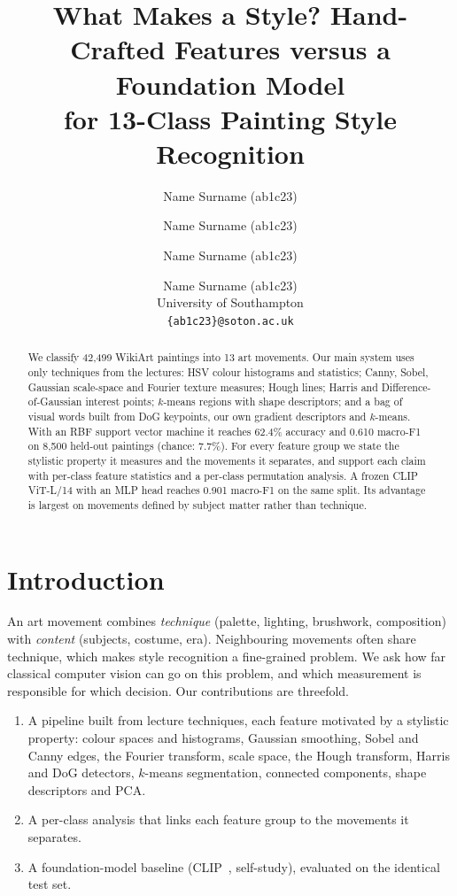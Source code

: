 \documentclass[10pt,twocolumn,a4paper]{article}
\begin{document}
\title{What Makes a Style? Hand-Crafted Features versus a Foundation Model\\for 13-Class Painting Style Recognition}

\author{
Name Surname (ab1c23) \and Name Surname (ab1c23) \and Name Surname (ab1c23) \and Name Surname (ab1c23)\\
University of Southampton\\
{\tt\small \{ab1c23\}@soton.ac.uk}
}

\maketitle

\begin{abstract}
We classify 42{,}499 WikiArt paintings into 13 art movements. Our main system uses only techniques from the lectures: HSV colour histograms and statistics; Canny, Sobel, Gaussian scale-space and Fourier texture measures; Hough lines; Harris and Difference-of-Gaussian interest points; $k$-means regions with shape descriptors; and a bag of visual words built from DoG keypoints, our own gradient descriptors and $k$-means. With an RBF support vector machine it reaches 62.4\% accuracy and 0.610 macro-F1 on 8{,}500 held-out paintings (chance: 7.7\%). For every feature group we state the stylistic property it measures and the movements it separates, and support each claim with per-class feature statistics and a per-class permutation analysis. A frozen CLIP ViT-L/14 with an MLP head reaches 0.901 macro-F1 on the same split. Its advantage is largest on movements defined by subject matter rather than technique.
\end{abstract}

\section{Introduction}
\label{sec:intro}

An art movement combines \emph{technique} (palette, lighting, brushwork, composition) with \emph{content} (subjects, costume, era). Neighbouring movements often share technique, which makes style recognition a fine-grained problem. We ask how far classical computer vision can go on this problem, and which measurement is responsible for which decision. Our contributions are threefold.
\begin{enumerate}
\item A pipeline built from lecture techniques, each feature motivated by a stylistic property: colour spaces and histograms, Gaussian smoothing, Sobel and Canny edges, the Fourier transform, scale space, the Hough transform, Harris and DoG detectors, $k$-means segmentation, connected components, shape descriptors and PCA.
\item A per-class analysis that links each feature group to the movements it separates.
\item A foundation-model baseline (CLIP~\cite{radford2021learning}, self-study), evaluated on the identical test set.
\end{enumerate}
\end{document}
